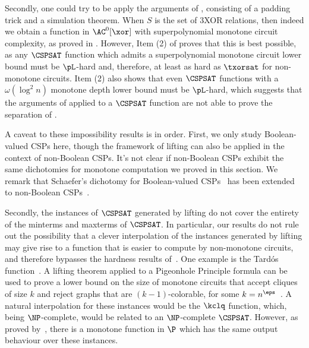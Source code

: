 \documentclass[11pt]{article}
\begin{document}
Secondly, one could try to be apply the arguments of
,
consisting of a padding trick and a simulation
theorem.
When $S$ is the set of 3XOR relations,
then indeed we obtain a function in $\AC^0[\xor]$ with superpolynomial
monotone circuit complexity,
as proved in .
However, 
Item (2) of 
proves that this is best possible,
as any $\CSPSAT$ function which admits a superpolynomial monotone circuit
lower bound must be $\pL$-hard and, therefore,
at least as hard as $\txorsat$ for non-monotone circuits.
Item (2) also shows that even $\CSPSAT$ functions with a $\omega(\log^2 n)$
monotone depth lower bound must be $\pL$-hard,
which suggests that the arguments of
 applied to a $\CSPSAT$ function
are not able to prove the separation of .

A caveat to these impossibility results is in order.
First, 
we only study Boolean-valued CSPs here,
though the framework of lifting can also be applied in the context of
non-Boolean CSPs.
It's not clear if non-Boolean CSPs exhibit the same dichotomies
for monotone computation
we proved in this section.
We remark that Schaefer's dichotomy for Boolean-valued CSPs~\cite{DBLP:conf/stoc/Schaefer78}
has been extended to non-Boolean
CSPs~\cite{DBLP:conf/focs/Zhuk17,DBLP:conf/focs/Bulatov17}.

Secondly,
the instances of $\CSPSAT$ generated by lifting
do not cover the entirety of the minterms and maxterms of $\CSPSAT$.
In particular, our results do not rule out the possibility
that a clever interpolation of the instances generated by lifting
may give rise to a function that is easier to compute by non-monotone
circuits,
and therefore bypasses the hardness results of~.
One example is the Tardós function~\cite{tardos_1988}.
A lifting theorem applied to a Pigeonhole Principle formula can be used to prove 
a lower bound on the size of monotone circuits that accept cliques of size
$k$ and reject graphs that are $(k-1)$-colorable, for some $k = n^\eps$~\cite{DBLP:journals/combinatorica/RazM99,susanna_2023}.
A natural interpolation for these instances would be the $\kclq$
function, which, being $\NP$-complete, would be related to an $\NP$-complete
$\CSPSAT$.
However, as proved by~\cite{tardos_1988}, there is a monotone function
in
$\P$ which has the same output behaviour over these instances. 
\end{document}
